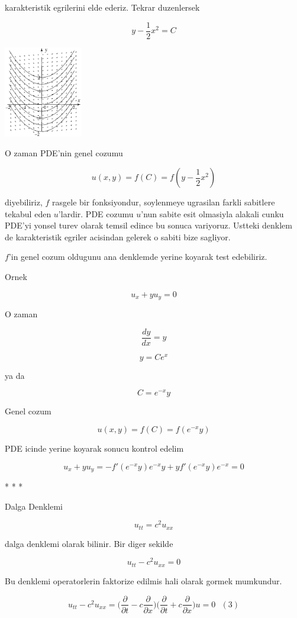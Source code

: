 \documentclass[12pt,fleqn]{article}\usepackage{../common}
\begin{document}
karakteristik egrilerini elde ederiz. Tekrar duzenlersek

\[ y - \frac{1}{2}x^2 = C \]

\includegraphics[height=4cm]{2_1.png}

O zaman PDE'nin genel cozumu 

\[ u(x,y) = f(C) = f(y - \frac{1}{2}x^2) \]

diyebiliriz, $f$ rasgele bir fonksiyondur, soylenmeye ugrasilan farkli
sabitlere tekabul eden $u$'lardir. PDE cozumu $u$'nun sabite esit olmasiyla
alakali cunku PDE'yi yonsel turev olarak temsil edince bu sonuca
variyoruz. Ustteki denklem de karakteristik egriler acisindan gelerek o
sabiti bize sagliyor.

$f$'in genel cozum oldugunu ana denklemde yerine koyarak test edebiliriz.

Ornek 

\[ u_x + yu_y = 0 \]

O zaman 

\[ \frac{dy}{dx} = y \]

\[ y = Ce^x \]

ya da

\[  C = e^{-x}y\]

Genel cozum 

\[ u(x,y) = f(C) = f(e^{-x}y) \]

PDE icinde yerine koyarak sonucu kontrol edelim

\[ u_x + yu_y = 
-f'(e^{-x}y)e^{-x}y + y f'(e^{-x}y) e^{-x} = 0
 \]

* * *

Dalga Denklemi 

\[ u_{tt} = c^2 u_{xx} \]

dalga denklemi olarak bilinir. Bir diger sekilde 

\[ u_{tt} - c^2 u_{xx} = 0\]

Bu denklemi operatorlerin faktorize edilmis hali olarak gormek mumkundur. 

\[ u_{tt} - c^2 u_{xx} = 
\bigg( \frac{\partial }{\partial t} - c \frac{\partial }{\partial x} \bigg)
\bigg( \frac{\partial }{\partial t} + c \frac{\partial }{\partial x} \bigg)
u = 0
\ \ \ (3)
\]
\end{document}
